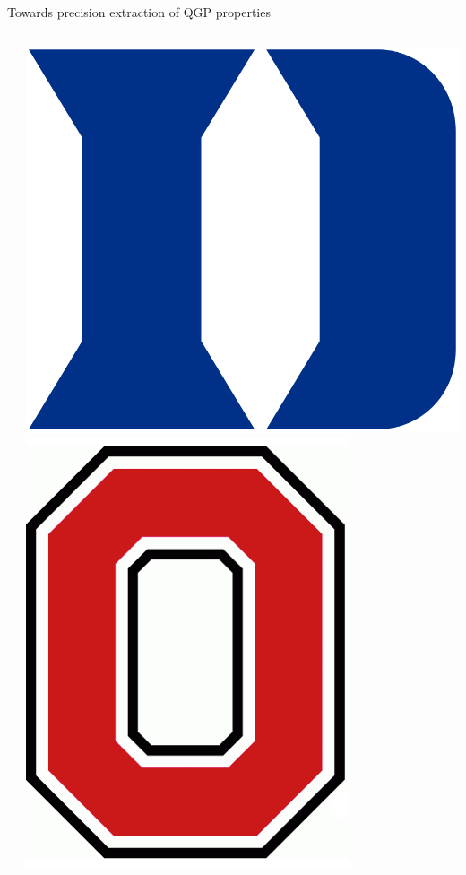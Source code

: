 \documentclass{beamer}
\begin{document}
\begin{frame}{Towards precision extraction of QGP properties}
  \begin{columns}[T]
    \begin{column}{0.025\textwidth}
    \end{column}
    \begin{column}{0.05\textwidth}
      \raggedleft
      \includegraphics[width=\columnwidth]{duke}\\[.5ex]
      \includegraphics[width=.9\columnwidth]{osu}

\end{column}
\end{columns}
\end{frame}
\end{document}
